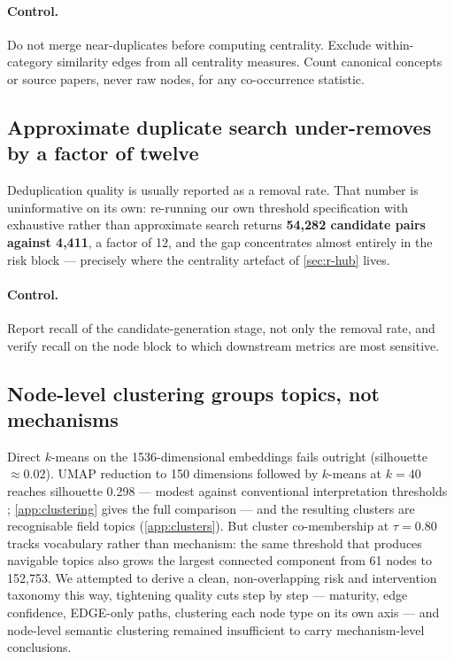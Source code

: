 \documentclass[10pt,twocolumn,letterpaper]{article}
\begin{document}
\paragraph{Control.} Do not merge near-duplicates before computing centrality. Exclude
within-category similarity edges from all centrality measures. Count canonical concepts
or source papers, never raw nodes, for any co-occurrence statistic.

\subsection{Approximate duplicate search under-removes by a factor of twelve}
\label{sec:r-recall}

Deduplication quality is usually reported as a removal rate. That number is uninformative
on its own: re-running our own threshold specification with exhaustive rather than
approximate search returns \textbf{54{,}282 candidate pairs against 4{,}411}, a factor of
12, and the gap concentrates almost entirely in the risk block --- precisely where the
centrality artefact of \cref{sec:r-hub} lives.

\paragraph{Control.} Report recall of the candidate-generation stage, not only the
removal rate, and verify recall on the node block to which downstream metrics are most
sensitive.

\subsection{Node-level clustering groups topics, not mechanisms}
\label{sec:r-clustering}

Direct $k$-means on the 1536-dimensional embeddings fails outright (silhouette
$\approx 0.02$). UMAP reduction to 150 dimensions followed by $k$-means at $k{=}40$
reaches silhouette 0.298 --- modest against conventional interpretation thresholds
\citep{kaufman1990finding}; \cref{app:clustering} gives the full comparison --- and the
resulting clusters are recognisable field topics (\cref{app:clusters}). But cluster
co-membership at $\tau{=}0.80$ tracks vocabulary rather than mechanism: the same
threshold that produces navigable topics also grows the largest connected component from
61 nodes to 152{,}753. We attempted to derive a clean, non-overlapping risk and
intervention taxonomy this way, tightening quality cuts step by step --- maturity, edge
confidence, EDGE-only paths, clustering each node type on its own axis --- and
node-level semantic clustering remained insufficient to carry mechanism-level
conclusions.
\end{document}

